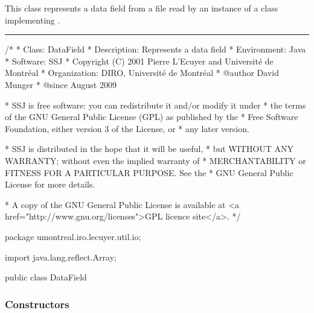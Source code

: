 
This class represents a data field from a file read by an instance of a class
 implementing .

\bigskip\hrule

\begin{code}
\begin{hide}
/*
 * Class:        DataField
 * Description:  Represents a data field
 * Environment:  Java
 * Software:     SSJ 
 * Copyright (C) 2001  Pierre L'Ecuyer and Université de Montréal
 * Organization: DIRO, Université de Montréal
 * @author       David Munger 
 * @since        August 2009

 * SSJ is free software: you can redistribute it and/or modify it under
 * the terms of the GNU General Public License (GPL) as published by the
 * Free Software Foundation, either version 3 of the License, or
 * any later version.

 * SSJ is distributed in the hope that it will be useful,
 * but WITHOUT ANY WARRANTY; without even the implied warranty of
 * MERCHANTABILITY or FITNESS FOR A PARTICULAR PURPOSE.  See the
 * GNU General Public License for more details.

 * A copy of the GNU General Public License is available at
   <a href="http://www.gnu.org/licenses">GPL licence site</a>.
 */
\end{hide}
package umontreal.iro.lecuyer.util.io;
\begin{hide}
import java.lang.reflect.Array;
\end{hide}

public class DataField \begin{hide} {
   protected String label;
   protected Object data;
   protected int effectiveLength;
\end{hide}
\end{code}

\subsubsection*{Constructors}

